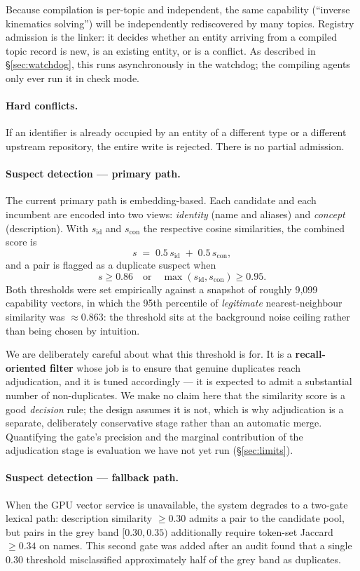 \documentclass[10pt,a4paper]{article}
\begin{document}
Because compilation is per-topic and independent, the same capability
(``inverse kinematics solving'') will be independently rediscovered by many
topics. Registry admission is the linker: it decides whether an entity arriving
from a compiled topic record is new, is an existing entity, or is a conflict.
As described in \S\ref{sec:watchdog}, this runs asynchronously in the watchdog;
the compiling agents only ever run it in check mode.

\paragraph{Hard conflicts.} If an identifier is already occupied by an entity of
a different type or a different upstream repository, the entire write is
rejected. There is no partial admission.

\paragraph{Suspect detection --- primary path.} The current primary path is
embedding-based. Each candidate and each incumbent are encoded into two views:
\emph{identity} (name and aliases) and \emph{concept} (description). With
$s_{\text{id}}$ and $s_{\text{con}}$ the respective cosine similarities, the
combined score is
\[
s \;=\; 0.5\,s_{\text{id}} \;+\; 0.5\,s_{\text{con}},
\]
and a pair is flagged as a duplicate suspect when
\[
s \geq 0.86 \quad\text{or}\quad \max(s_{\text{id}}, s_{\text{con}}) \geq 0.95 .
\]
Both thresholds were set empirically against a snapshot of roughly 9{,}099
capability vectors, in which the 95th percentile of \emph{legitimate}
nearest-neighbour similarity was $\approx 0.863$: the threshold sits at the
background noise ceiling rather than being chosen by intuition.

We are deliberately careful about what this threshold is for. It is a
\textbf{recall-oriented filter} whose job is to ensure that genuine duplicates
reach adjudication, and it is tuned accordingly --- it is expected to admit a
substantial number of non-duplicates. We make no claim here that the similarity
score is a good \emph{decision} rule; the design assumes it is not, which is why
adjudication is a separate, deliberately conservative stage rather than an
automatic merge. Quantifying the gate's precision and the marginal contribution
of the adjudication stage is evaluation we have not yet run
(\S\ref{sec:limits}).

\paragraph{Suspect detection --- fallback path.} When the GPU vector service is
unavailable, the system degrades to a two-gate lexical path: description
similarity $\geq 0.30$ admits a pair to the candidate pool, but pairs in the grey
band $[0.30, 0.35)$ additionally require token-set Jaccard $\geq 0.34$ on names.
This second gate was added after an audit found that a single $0.30$ threshold
misclassified approximately half of the grey band as duplicates.
\end{document}
